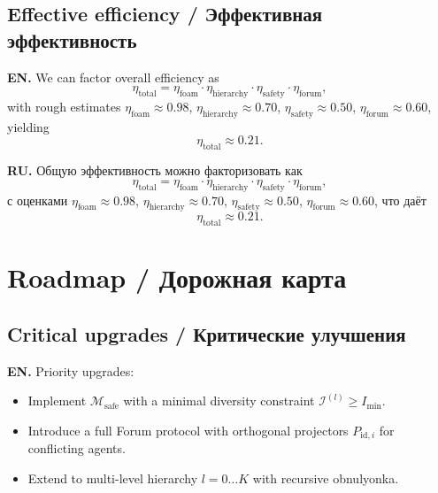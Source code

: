 \documentclass[11pt,a4paper]{article}
\begin{document}
\subsection{Effective efficiency / Эффективная эффективность}

\textbf{EN.}
We can factor overall efficiency as
\begin{equation}
\eta_{\text{total}} = \eta_{\text{foam}} \cdot \eta_{\text{hierarchy}} \cdot \eta_{\text{safety}} \cdot \eta_{\text{forum}},
\end{equation}
with rough estimates
$\eta_{\text{foam}} \approx 0.98$,
$\eta_{\text{hierarchy}} \approx 0.70$,
$\eta_{\text{safety}} \approx 0.50$,
$\eta_{\text{forum}} \approx 0.60$,
yielding
\begin{equation}
\eta_{\text{total}} \approx 0.21.
\end{equation}

\textbf{RU.}
Общую эффективность можно факторизовать как
\begin{equation}
\eta_{\text{total}} = \eta_{\text{foam}} \cdot \eta_{\text{hierarchy}} \cdot \eta_{\text{safety}} \cdot \eta_{\text{forum}},
\end{equation}
с оценками
$\eta_{\text{foam}} \approx 0.98$,
$\eta_{\text{hierarchy}} \approx 0.70$,
$\eta_{\text{safety}} \approx 0.50$,
$\eta_{\text{forum}} \approx 0.60$,
что даёт
\begin{equation}
\eta_{\text{total}} \approx 0.21.
\end{equation}

\section{Roadmap / Дорожная карта}

\subsection{Critical upgrades / Критические улучшения}

\textbf{EN.}
Priority upgrades:
\begin{itemize}
\item Implement $\mathcal{M}_{\text{safe}}$ with a minimal diversity constraint $\mathcal{I}^{(l)} \ge I_{\min}$.
\item Introduce a full Forum protocol with orthogonal projectors $P_{\text{id},i}$ for conflicting agents.
\item Extend to multi-level hierarchy $l=0\ldots K$ with recursive obnulyonka.
\end{itemize}
\end{document}
